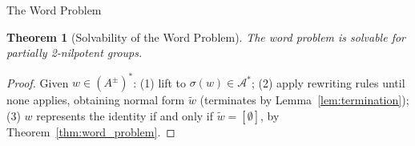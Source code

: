 \documentclass{article}
\newtheorem{theorem}{Theorem}[section]
\theoremstyle{definition}
\theoremstyle{remark}
\theoremstyle{theorem}
\theoremstyle{definition}
\begin{document}
\begin{section}{The Word Problem}
\begin{theorem}[Solvability of the Word Problem]\label{thm:solvability}
    The word problem is solvable for partially 2-nilpotent groups.
\end{theorem}

\begin{proof}
Given $w \in (A^{\pm})^*$: (1) lift to $\sigma(w) \in \mathcal{A}^*$; (2) apply rewriting rules until none applies, obtaining normal form $\tilde{w}$ (terminates by Lemma~\ref{lem:termination}); (3) $w$ represents the identity if and only if $\tilde{w} = [\emptyset]$, by Theorem~\ref{thm:word_problem}.
\end{proof}

\end{section}

\printbibliography
\end{document}
